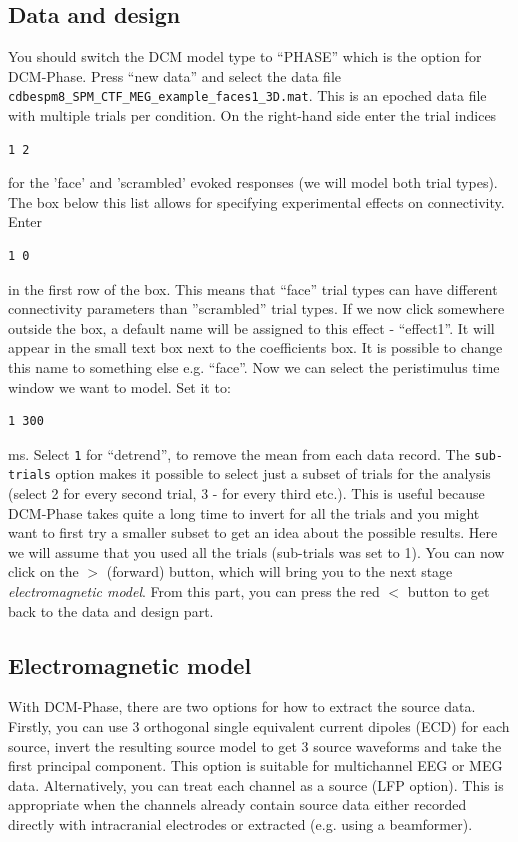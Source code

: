 \subsection{Data and design}

 You should switch the DCM model type to ``PHASE'' which is the option for DCM-Phase. Press ``new data'' and select the data file \texttt{cdbespm8\_\-SPM\_\-CTF\_\-MEG\_\-example\_\-faces1\_\-3D.mat}. This is an epoched data file with multiple trials per condition.  On the right-hand side enter the trial indices
\begin{verbatim}
1 2
\end{verbatim} 
for the 'face' and 'scrambled' evoked responses (we will model both trial types).
 The box below this list allows for specifying experimental effects on connectivity. Enter 
\begin{verbatim}
1 0
\end{verbatim} 
in the first row of the box. This means that ``face'' trial types can have different connectivity parameters than ''scrambled'' trial types. If we now click somewhere outside the box, a default name will be assigned to this effect - ``effect1''. It will appear in the small text box next to the coefficients box. It is possible to change this name to something else e.g. ``face''. Now we can select the peristimulus time window we want to model. 
Set it to:
\begin{verbatim}
1 300
\end{verbatim} 
ms. Select \texttt{1} for ``detrend'', to  remove the mean from each data record.  The \texttt{sub-trials} option makes it possible to select just a subset of trials for the analysis (select 2 for every second trial, 3 - for every third etc.). This is useful because DCM-Phase takes quite a long time to invert for all the trials and you might want to first try a smaller subset to get an idea about the possible results. Here we will assume that you used all the trials (sub-trials was set to 1). You can now click on the $>$ (forward) button, which will bring you to the next stage \textit{electromagnetic model}. From this part, you can press the red $<$ button to get back to the data and design part.

\subsection{Electromagnetic model}

With DCM-Phase, there are two options for how to extract the source data. Firstly, you can use 3 orthogonal single equivalent current dipoles (ECD) for each source, invert the resulting source model to get 3 source waveforms and take the first principal component. This option is suitable for multichannel EEG or MEG data. Alternatively, you can treat each channel as a source (LFP option). This is appropriate when the channels already contain source data either recorded directly with intracranial electrodes or extracted (e.g. using a beamformer). 

